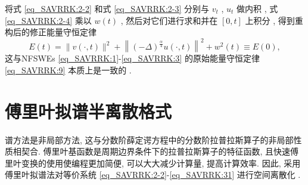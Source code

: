 将式 \eqref{eq_SAVRRK:2-2} 和式 \eqref{eq_SAVRRK:2-3} 分别与 $v_t$  , $u_t$ 做内积 , 
式 \eqref{eq_SAVRRK:2-4} 乘以 $w(t)$ , 然后对它们进行求和并在 $[0 , t]$ 上积分 , 得到重构后的修正能量守恒定律
\begin{equation}
E(t)=\|v(\cdot , t)\|^2+\left\|(-\Delta)^{\frac{\alpha}{4}} u(\cdot , t)\right\|^{2}+w^2(t) \equiv E(0) , 
\end{equation}
这与NFSWEs \eqref{eq_SAVRRK:1}-\eqref{eq_SAVRRK:3} 的原始能量守恒定律 \eqref{eq_SAVRRK:9} 本质上是一致的 . 

\section{傅里叶拟谱半离散格式}\label{Section_SAVRRK: 3}

谱方法是非局部方法, 这与分数阶薛定谔方程中的分数阶拉普拉斯算子的非局部性质相契合.
傅里叶基函数是周期边界条件下的拉普拉斯算子的特征函数, 且快速傅里叶变换的使用使编程更加简便, 可以大大减少计算量, 提高计算效率.
因此, 采用傅里叶拟谱法对等价系统 \eqref{eq_SAVRRK:2-2}-\eqref{eq_SAVRRK:31} 进行空间离散化 . 

